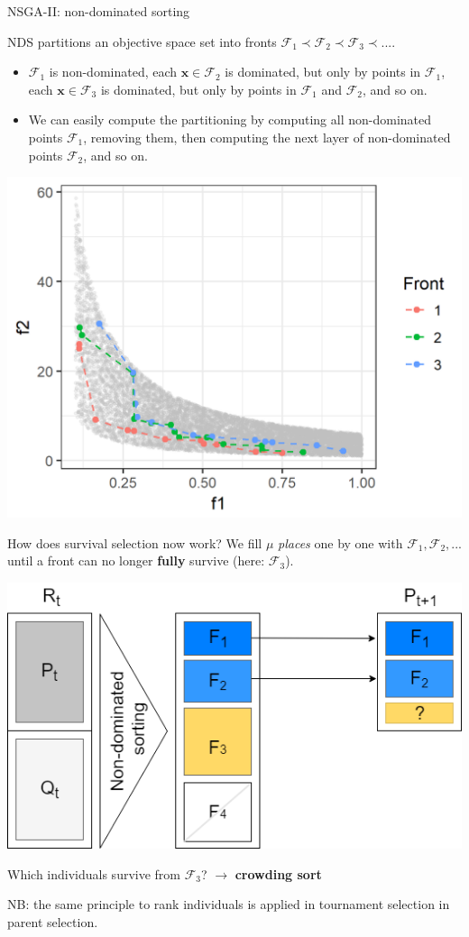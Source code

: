 \documentclass[11pt,compress,t,notes=noshow, xcolor=table]{beamer}
\begin{document}
\begin{vbframe}{NSGA-II: non-dominated sorting}



\begin{footnotesize}
NDS partitions an objective space set into fronts $\mathcal{F}_1 \prec \mathcal{F}_2 \prec \mathcal{F}_3 \prec ... $.

\begin{itemize}
    \item $\mathcal{F}_1$ is non-dominated, 
      each $\bm{x} \in \mathcal{F}_2$ is dominated, but only by points in $\mathcal{F}_1$, 
      each $\bm{x} \in \mathcal{F}_3$ is dominated, but only by points in $\mathcal{F}_1$ and $\mathcal{F}_2$, 
      and so on. 
    \item We can easily compute the partitioning by computing all non-dominated points  $\mathcal{F}_1$,
        removing them, then computing the next layer of non-dominated points $\mathcal{F}_2$, and so on.
\end{itemize}
\end{footnotesize}

\begin{center}
\includegraphics[width = 0.5\linewidth]{figure_man/NSGA2_NDS.png}
\end{center}

\framebreak

How does survival selection now work? We fill $\mu$ \textit{places} one by one with $\mathcal{F}_1, \mathcal{F}_2, ...$ until a front can no longer \textbf{fully} survive (here: $\mathcal{F}_3$).

\begin{center}
\includegraphics[width = 0.45\linewidth]{figure_man/NSGA2_2.png}
\end{center}

Which individuals survive from $\mathcal{F}_3$? $\to$ \textbf{crowding sort}
\vspace{0.3cm}

\footnotesize{NB: the same principle to rank individuals is applied in tournament selection in parent selection.}
\end{vbframe}
\end{document}
